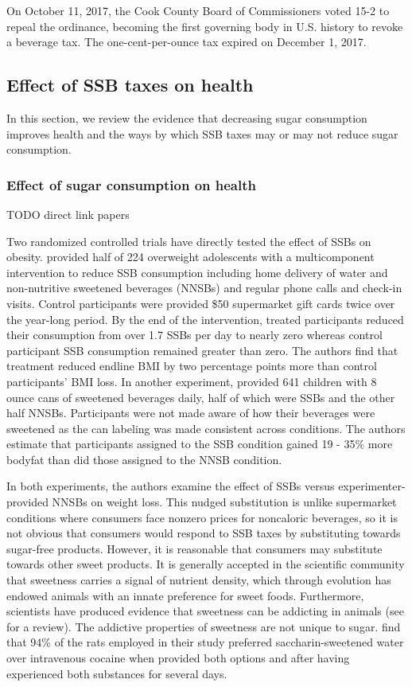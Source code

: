 \documentclass[12pt]{article}
\begin{document}
On October 11, 2017, the Cook County Board of Commissioners voted 15-2 to repeal the ordinance, becoming the first governing body in U.S. history to revoke a beverage tax. The one-cent-per-ounce tax expired on December 1, 2017.

\subsection{Effect of SSB taxes on health}

In this section, we review the evidence that decreasing sugar consumption improves health and the ways by which SSB taxes may or may not reduce sugar consumption.

\subsubsection{Effect of sugar consumption on health}

TODO direct link papers

Two randomized controlled trials have directly tested the effect of SSBs on obesity. \textcite{ebbeling2012randomized} provided half of 224 overweight adolescents with a multicomponent intervention to reduce SSB consumption including home delivery of water and non-nutritive sweetened beverages (NNSBs) and regular phone calls and check-in visits. Control participants were provided \$50 supermarket gift cards twice over the year-long period. By the end of the intervention, treated participants reduced their consumption from over 1.7 SSBs per day to nearly zero whereas control participant SSB consumption remained greater than zero. The authors find that treatment reduced endline BMI by two percentage points more than control participants' BMI loss. In another experiment, \textcite{de2012trial} provided 641 children with 8 ounce cans of sweetened beverages daily, half of which were SSBs and the other half NNSBs. Participants were not made aware of how their beverages were sweetened as the can labeling was made consistent across conditions. The authors estimate that participants assigned to the SSB condition gained 19 - 35\% more bodyfat than did those assigned to the NNSB condition.

In both experiments, the authors examine the effect of SSBs versus experimenter-provided NNSBs on weight loss. This nudged substitution is unlike supermarket conditions where consumers face nonzero prices for noncaloric beverages, so it is not obvious that consumers would respond to SSB taxes by substituting towards sugar-free products. However, it is reasonable that consumers may substitute towards other sweet products. It is generally accepted in the scientific community that sweetness carries a signal of nutrient density, which through evolution has endowed animals with an innate preference for sweet foods. Furthermore, scientists have produced evidence that sweetness can be addicting in animals (see \textcite{avena2008evidence} for a review). The addictive properties of sweetness are not unique to sugar. \textcite{lenoir2007intense} find that 94\% of the rats employed in their study preferred saccharin-sweetened water over intravenous cocaine when provided both options and after having experienced both substances for several days.
\end{document}
